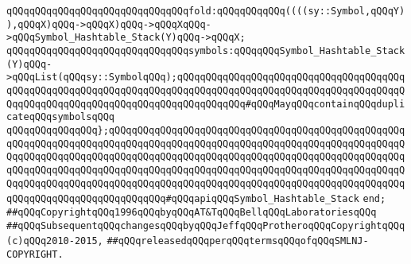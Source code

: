 \verb|qQQqqQQqqQQqqQQqqQQqqQQqqQQqqQQqfold:qQQqqQQqqQQq((((sy::Symbol,qQQqY)),qQQqX)qQQq->qQQqX)qQQq->qQQqXqQQq->qQQqSymbol_Hashtable_Stack(Y)qQQq->qQQqX;|\newline
\newline
\verb|qQQqqQQqqQQqqQQqqQQqqQQqqQQqqQQqsymbols:qQQqqQQqSymbol_Hashtable_Stack(Y)qQQq->qQQqList(qQQqsy::SymbolqQQq);qQQqqQQqqQQqqQQqqQQqqQQqqQQqqQQqqQQqqQQqqQQqqQQqqQQqqQQqqQQqqQQqqQQqqQQqqQQqqQQqqQQqqQQqqQQqqQQqqQQqqQQqqQQqqQQqqQQqqQQqqQQqqQQqqQQqqQQqqQQqqQQqqQQqqQQq#qQQqMayqQQqcontainqQQqduplicateqQQqsymbolsqQQq|\newline
\verb|qQQqqQQqqQQqqQQq};qQQqqQQqqQQqqQQqqQQqqQQqqQQqqQQqqQQqqQQqqQQqqQQqqQQqqQQqqQQqqQQqqQQqqQQqqQQqqQQqqQQqqQQqqQQqqQQqqQQqqQQqqQQqqQQqqQQqqQQqqQQqqQQqqQQqqQQqqQQqqQQqqQQqqQQqqQQqqQQqqQQqqQQqqQQqqQQqqQQqqQQqqQQqqQQqqQQqqQQqqQQqqQQqqQQqqQQqqQQqqQQqqQQqqQQqqQQqqQQqqQQqqQQqqQQqqQQqqQQqqQQqqQQqqQQqqQQqqQQqqQQqqQQqqQQqqQQqqQQqqQQqqQQqqQQqqQQqqQQqqQQqqQQqqQQqqQQqqQQqqQQqqQQqqQQqqQQqqQQq#qQQqapiqQQqSymbol_Hashtable_Stack|\newline
\verb|end;|\newline
\newline
\verb|##qQQqCopyrightqQQq1996qQQqbyqQQqAT&TqQQqBellqQQqLaboratoriesqQQq|\newline
\verb|##qQQqSubsequentqQQqchangesqQQqbyqQQqJeffqQQqProtheroqQQqCopyrightqQQq(c)qQQq2010-2015,|\newline
\verb|##qQQqreleasedqQQqperqQQqtermsqQQqofqQQqSMLNJ-COPYRIGHT.|\newline

